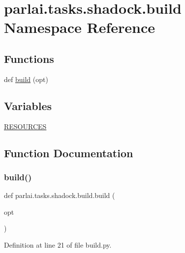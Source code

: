 \hypertarget{namespaceparlai_1_1tasks_1_1shadock_1_1build}{}\section{parlai.\+tasks.\+shadock.\+build Namespace Reference}
\label{namespaceparlai_1_1tasks_1_1shadock_1_1build}
\subsection*{Functions}
\begin{DoxyCompactItemize}
\item 
def \hyperlink{namespaceparlai_1_1tasks_1_1shadock_1_1build_a5d6e87fcb7bff465b029bf7cd3031c0a}{build} (opt)
\end{DoxyCompactItemize}
\subsection*{Variables}
\begin{DoxyCompactItemize}
\item 
\hyperlink{namespaceparlai_1_1tasks_1_1shadock_1_1build_a5af01f72748dbdcccd71aab32f5cbcbe}{R\+E\+S\+O\+U\+R\+C\+ES}
\end{DoxyCompactItemize}


\subsection{Function Documentation}
\mbox{\label{namespaceparlai_1_1tasks_1_1shadock_1_1build_a5d6e87fcb7bff465b029bf7cd3031c0a}} 
\subsubsection{\texorpdfstring{build()}{build()}}
{\footnotesize\ttfamily def parlai.\+tasks.\+shadock.\+build.\+build (\begin{DoxyParamCaption}\item[{}]{opt }\end{DoxyParamCaption})}



Definition at line 21 of file build.\+py.


